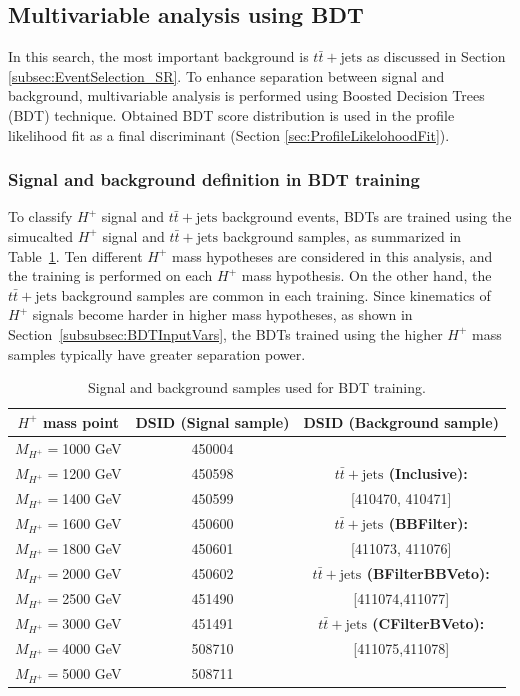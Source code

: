 \subsection{Multivariable analysis using BDT}
\label{subsec:MVA}
In this search, the most important background is $t\bar{t}+\text{jets}$ as discussed in Section \ref{subsec:EventSelection_SR}. To enhance separation between signal and background, multivariable analysis is performed using Boosted Decision Trees (BDT) technique. Obtained BDT score distribution is used in the profile likelihood fit as a final discriminant (Section \ref{sec:ProfileLikelohoodFit}).

\subsubsection{Signal and background definition in BDT training}
To classify $H^{+}$ signal and $t\bar{t}+\text{jets}$ background events, BDTs are trained using the simucalted $H^{+}$ signal and $t\bar{t}+\text{jets}$ background samples, as summarized in Table~\ref{tab:BDTInputDatasets}. Ten different $H^{+}$ mass hypotheses are considered in this analysis, and the training is performed on each $H^{+}$ mass hypothesis. On the other hand, the $t\bar{t}+\text{jets}$ background samples are common in each training. Since kinematics of $H^+$ signals become harder in higher mass hypotheses, as shown in Section~\ref{subsubsec:BDTInputVars}, the BDTs trained using the higher $H^{+}$ mass samples typically have greater separation power.

\begin{table}[H]
  \centering
  \begin{tabular*}{140mm}{c|c|c}
    \hline
    $H^{+}$ mass  point  & DSID (Signal sample) & DSID (Background sample)\\
    \hline
    $M_{H^{+}}=$1000 GeV & 450004               & \\
    $M_{H^{+}}=$1200 GeV & 450598               & \textbf{$t\bar{t}+\text{jets}$ (Inclusive):}\\
    $M_{H^{+}}=$1400 GeV & 450599               & [410470, 410471]\\
    $M_{H^{+}}=$1600 GeV & 450600               & \textbf{$t\bar{t}+\text{jets}$ (BBFilter):}\\
    $M_{H^{+}}=$1800 GeV & 450601               & [411073, 411076]\\
    $M_{H^{+}}=$2000 GeV & 450602               & \textbf{$t\bar{t}+\text{jets}$ (BFilterBBVeto):}\\
    $M_{H^{+}}=$2500 GeV & 451490               & [411074,411077]\\
    $M_{H^{+}}=$3000 GeV & 451491               & \textbf{$t\bar{t}+\text{jets}$ (CFilterBVeto):}\\
    $M_{H^{+}}=$4000 GeV & 508710               & [411075,411078]\\
    $M_{H^{+}}=$5000 GeV & 508711               & \\
    \hline
  \end{tabular*}
  \caption{Signal and background samples used for BDT training.}
  \label{tab:BDTInputDatasets}
\end{table}

